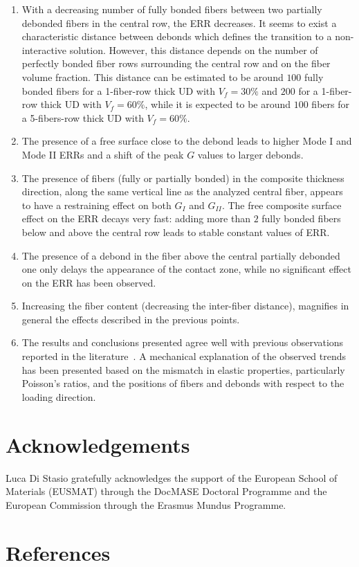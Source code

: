 \begin{enumerate}
\item With a decreasing number of fully bonded fibers between two partially debonded fibers in the central row, the ERR decreases. It seems to exist a characteristic distance between debonds which defines the transition to a non-interactive solution. However, this distance depends on the number of perfectly bonded fiber rows surrounding the central row and on the fiber volume fraction. This distance can be estimated to be around $100$ fully bonded fibers for a 1-fiber-row thick UD with $V_{f}=30\%$ and $200$ for a 1-fiber-row thick UD with $V_{f}=60\%$, while it is expected to be around $100$ fibers for a 5-fibers-row thick UD with $V_{f}=60\%$.
\item The presence of a free surface close to the debond leads to higher Mode I and Mode II ERRs and a shift of the peak $G$ values to larger debonds.
\item The presence of fibers (fully or partially bonded) in the composite thickness direction, along the same vertical line as the analyzed central fiber, appears to have a restraining effect on both $G_{I}$ and $G_{II}$. The free composite surface effect on the ERR decays very fast: adding more than $2$ fully bonded fibers below and above the central row leads to stable constant values of ERR.
\item The presence of a debond in the fiber above the central partially debonded one only delays the appearance of the contact zone, while no significant effect on the ERR has been observed.
\item Increasing the fiber content (decreasing the inter-fiber distance), magnifies in general the effects described in the previous points.
\item The results and conclusions presented agree well with previous observations reported in the literature~\cite{Sandino2016,Zhuang2018}. A mechanical explanation of the observed trends has been presented based on the mismatch in elastic properties, particularly Poisson's ratios, and the positions of fibers and debonds with respect to the loading direction.
\end{enumerate}

\section*{Acknowledgements}

Luca Di Stasio gratefully acknowledges the support of the European School of Materials (EUSMAT) through the DocMASE Doctoral Programme and the European Commission through the Erasmus Mundus Programme.

%
\section*{References}
\printbibliography[heading=none]

